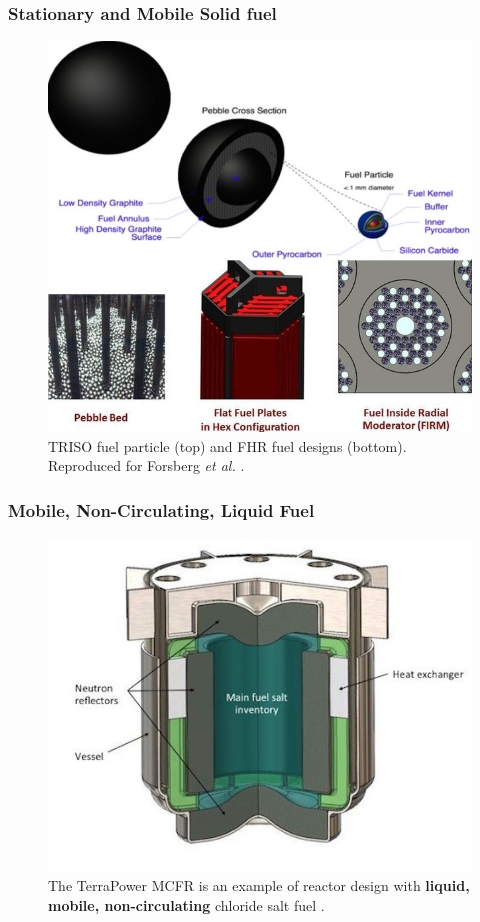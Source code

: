 \begin{frame}
\frametitle{Stationary and Mobile Solid fuel}
\vspace*{-0.1in}
\begin{figure}[t]
	\hspace*{-0.35in}
	\includegraphics[height=0.63\textwidth]{./images/solid_fuel.jpg}
	\caption{TRISO fuel particle (top) and FHR fuel designs (bottom). 
	Reproduced for Forsberg \emph{et al.} \cite{forsberg_basis_2016}.} 
\end{figure}   
\end{frame}

\begin{frame}
\frametitle{Mobile, Non-Circulating, Liquid Fuel}
\begin{figure}[t]
\vspace*{-0.1in}
\hspace*{-0.35in}
\includegraphics[height=0.6\textwidth]{./images/mcfr-crossection.jpg}
\caption{The TerraPower MCFR is an example of reactor design with 
\textbf{liquid, mobile, non-circulating} chloride salt fuel 
\cite{doene_southern_2018}.}
\end{figure}   

\end{frame}


